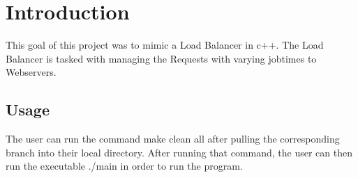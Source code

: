 \hypertarget{index_intro_sec}{}\section{Introduction}\label{index_intro_sec}
This goal of this project was to mimic a Load Balancer in c++. The Load Balancer is tasked with managing the Requests with varying jobtimes to Webservers.\hypertarget{index_Usage}{}\subsection{Usage}\label{index_Usage}
The user can run the command \textquotesingle{}make clean all\textquotesingle{} after pulling the corresponding branch into their local directory. After running that command, the user can then run the executable \textquotesingle{}./main\textquotesingle{} in order to run the program. 